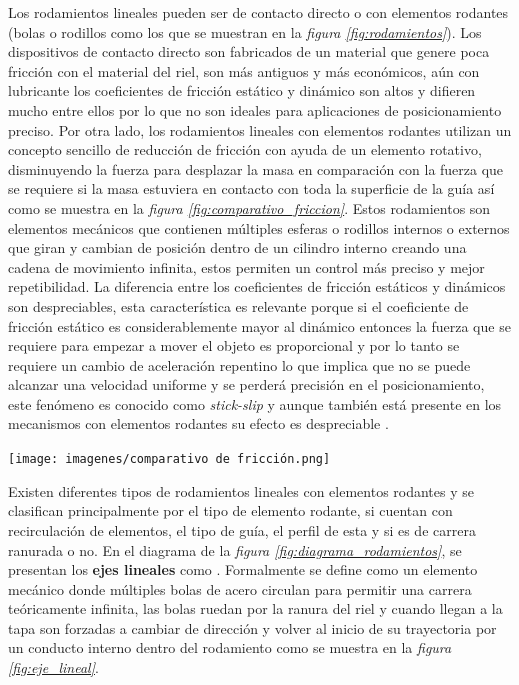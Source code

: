 Los rodamientos lineales pueden ser de contacto directo o con elementos rodantes (bolas o rodillos como los que se muestran en la \emph{figura \ref{fig:rodamientos}}). Los dispositivos de contacto directo son fabricados de un material que genere poca fricción con el material del riel, son más antiguos y más económicos, aún con lubricante los coeficientes de fricción estático y dinámico son altos y difieren mucho entre ellos por lo que no son ideales para aplicaciones de posicionamiento preciso. Por otra lado, los rodamientos lineales con elementos rodantes utilizan un concepto sencillo de reducción de fricción con ayuda de un elemento rotativo, disminuyendo la fuerza para desplazar la masa en comparación con la fuerza que se requiere si la masa estuviera en contacto con toda la superficie de la guía así como se muestra en la \emph{figura \ref{fig:comparativo_friccion}}. Estos rodamientos son elementos mecánicos que contienen múltiples esferas o rodillos internos o externos que giran y cambian de posición dentro de un cilindro interno creando una cadena de movimiento infinita, estos permiten un control más preciso y mejor repetibilidad. La diferencia entre los coeficientes de fricción estáticos y dinámicos son despreciables, esta característica es relevante porque si el coeficiente de fricción estático es considerablemente mayor al dinámico entonces la fuerza que se requiere para empezar a mover el objeto es proporcional y por lo tanto se requiere un cambio de aceleración repentino lo que implica que no se puede alcanzar una velocidad uniforme y se perderá precisión en el posicionamiento, este fenómeno es conocido como \textit{stick-slip} y aunque también está presente en los mecanismos con elementos rodantes su efecto es despreciable \cite{Referencia4}.\\

\begin{center}
    \texttt{[image: imagenes/comparativo de fricción.png]}
    \label{fig:comparativo_friccion}
\end{center}
Existen diferentes tipos de rodamientos lineales con elementos rodantes y se clasifican principalmente por el tipo de elemento rodante, si cuentan con recirculación de elementos, el tipo de guía, el perfil de esta y si es de carrera ranurada o no. En el diagrama de la \emph{figura \ref{fig:diagrama_rodamientos}}, se presentan los \textbf{ejes lineales} como . Formalmente se define como un elemento mecánico donde múltiples bolas de acero circulan para permitir una carrera teóricamente infinita, las bolas ruedan por la ranura del riel y cuando llegan a la tapa son forzadas a cambiar de dirección y volver al inicio de su trayectoria por un conducto interno dentro del rodamiento como se muestra en la \emph{figura \ref{fig:eje_lineal}}. \cite{Referencia4}


